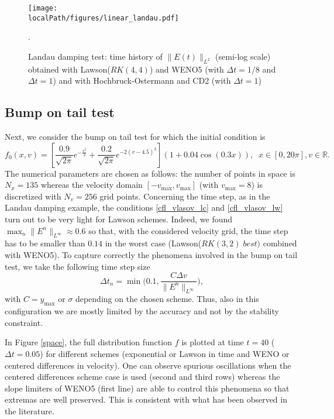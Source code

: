 \begin{figure}[h]
	\centering
  \texttt{[image: \\localPath/figures/linear\_landau.pdf]}
	\caption{Landau damping test: time history of $\|E(t)\|_{L^2}$ (semi-log scale) obtained with Lawson($RK(4, 4)$) and WENO5 
	(with $\Delta t=1/8$ and $\Delta t=1$) and with Hochbruck-Ostermann and CD2 (with $\Delta t=1$)}.
	\label{ld}
\end{figure}



\subsection{Bump on tail test}

Next, we consider the bump on tail test for which the initial condition is 
$$
  f_0(x, v) = \left[\frac{0.9}{\sqrt{2\pi}} e^{-\frac{v^2}{2}} + \frac{0.2}{\sqrt{2\pi}} e^{-2(v-4.5)^2} \right](1+0.04 \cos(0.3 x)), \;\; x\in [0, 20\pi], v\in \mathbb{R}. 
$$
The numerical parameters are chosen as follows: the number of points in space is $N_x=135$ whereas the velocity domain $[-v_{\max}, v_{\max}]$ (with $v_{\max}=8$) is discretized with $N_v=256$ grid points. Concerning the time step, as in the Landau damping example, the conditions \eqref{cfl_vlasov_lc} and \eqref{cfl_vlasov_lw} turn out to be very light for Lawson schemes. Indeed, we found $\max_n \| E^n \|_{L^\infty} \approx 0.6$ so that, with the considered velocity grid, the time step has to be smaller than $0.14$ 
in the worst case (Lawson($RK(3, 2) \; best)$ combined with WENO5). To capture correctly the phenomena involved in the bump on tail test, we take the following time step size
\begin{equation}
  \label{dtbot}
  \Delta t_n = \min \Big( 0.1,  \frac{C \Delta v}{\|E^n\|_{L^\infty}} \Big), 
\end{equation}
with $C=y_{\max}$ or $\sigma$ depending on the chosen scheme. Thus, also in this configuration we are mostly limited by the accuracy and not by the stability constraint.

In Figure \ref{space}, the full distribution function $f$ is plotted at time $t=40$ ($\Delta t=0.05$) for different schemes (exponential or Lawson in time and WENO or centered differences in velocity). One can observe spurious oscillations when the centered differences scheme case is used (second and third rows) whereas the slope limiters of WENO5 (first line) are able to control this phenomena so that extremas are well preserved. This is consistent with what has been observed in the literature.

